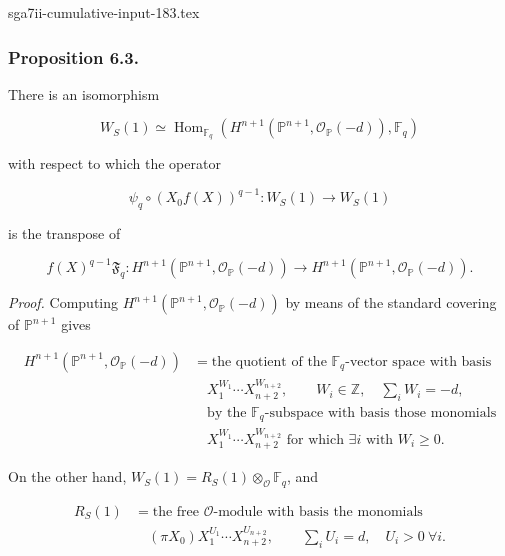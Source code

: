 \begin{filecontents*}{sga7ii-cumulative-input-183.tex}
\subsubsection*{Proposition 6.3.}
There is an isomorphism

\begin{equation}\tag{6.3.1}
W_S(1)\simeq
\operatorname{Hom}_{\mathbb F_q}\!\left(
H^{n+1}(\mathbb P^{n+1},\mathcal O_{\mathbb P}(-d)),
\mathbb F_q\right)
\end{equation}

with respect to which the operator

\begin{equation}\tag{6.3.2}
\psi_q\circ(X_0f(X))^{q-1}:W_S(1)\longrightarrow W_S(1)
\end{equation}

is the transpose of

\begin{equation}\tag{6.3.3}
f(X)^{q-1}\mathfrak F_q:
H^{n+1}(\mathbb P^{n+1},\mathcal O_{\mathbb P}(-d))
\longrightarrow
H^{n+1}(\mathbb P^{n+1},\mathcal O_{\mathbb P}(-d)).
\end{equation}

\noindent\emph{Proof.}
Computing
$H^{n+1}(\mathbb P^{n+1},\mathcal O_{\mathbb P}(-d))$
by means of the standard covering of $\mathbb P^{n+1}$ gives

\begin{equation}\tag{6.3.4}
\begin{aligned}
H^{n+1}(\mathbb P^{n+1},\mathcal O_{\mathbb P}(-d))
&=\text{the quotient of the $\mathbb F_q$-vector space with basis}\\
&\quad X_1^{W_1}\cdots X_{n+2}^{W_{n+2}},
\qquad W_i\in\mathbb Z,\quad\sum_iW_i=-d,\\
&\quad\text{by the $\mathbb F_q$-subspace with basis those monomials}\\
&\quad X_1^{W_1}\cdots X_{n+2}^{W_{n+2}}
\text{ for which }\exists i\text{ with }W_i\geq0.
\end{aligned}
\end{equation}

On the other hand, $W_S(1)=R_S(1)\otimes_{\mathcal O}\mathbb F_q$, and

\begin{equation}\tag{6.3.5}
\begin{aligned}
R_S(1)
&=\text{the free $\mathcal O$-module with basis the monomials}\\
&\quad
(\pi X_0)X_1^{U_1}\cdots X_{n+2}^{U_{n+2}},
\qquad
\sum_iU_i=d,\quad U_i>0\ \forall i.
\end{aligned}
\end{equation}


\end{filecontents*}
